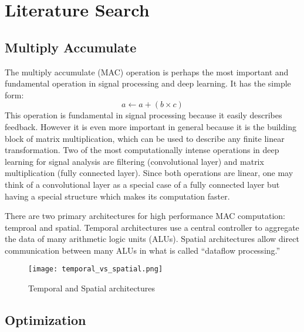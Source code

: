 \section{Literature Search}
\subsection{Multiply Accumulate}
The multiply accumulate (MAC) operation is perhaps the most important and fundamental operation in signal processing and deep learning.  It has the simple form:
$$ a \leftarrow a + (b\times c) $$
This operation is fundamental in signal processing because it easily describes feedback.  However it is even more important in general because it is the building block of matrix multiplication, which can be used to describe any finite linear transformation.  Two of the most computationally intense operations in deep learning for signal analysis are filtering (convolutional layer) and matrix multiplication (fully connected layer).  Since both operations are linear, one may think of a convolutional layer as a special case of a fully connected layer but having a special structure which makes its computation faster.

There are two primary architectures for high performance MAC computation: temproal and spatial. Temporal architectures use a central controller to aggregate the data of many arithmetic logic units (ALUs).  Spatial architectures allow direct communication between many ALUs in what is called ``dataflow processing.'' ~\cite{DBLP:journals/corr/SzeCYE17} 

\begin{figure}[H]
  \centering
  \texttt{[image: temporal\_vs\_spatial.png]}
  \caption{Temporal and Spatial architectures  ~\cite{DBLP:journals/corr/SzeCYE17}}
\end{figure} 

\subsection{Optimization}
